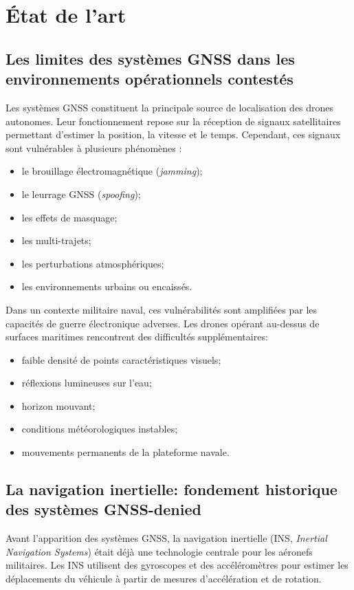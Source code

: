 \documentclass[12pt, a4paper, twoside, openright]{report}
\begin{document}
\section{État de l’art}

\subsection{Les limites des systèmes GNSS dans les environnements opérationnels contestés}
Les systèmes GNSS constituent la principale source de localisation des drones autonomes. Leur fonctionnement repose sur la réception de signaux satellitaires permettant d’estimer la position, la vitesse et le temps. Cependant, ces signaux sont vulnérables à plusieurs phénomènes \cite{mostafa2016gnss, mostafa2022gnss}:
\begin{itemize}
    \item le brouillage électromagnétique (\textit{jamming});
        \item le leurrage GNSS (\textit{spoofing});
    \item les effets de masquage;
    \item les multi-trajets;
    \item les perturbations atmosphériques;
    \item les environnements urbains ou encaissés.
\end{itemize}

Dans un contexte militaire naval, ces vulnérabilités sont amplifiées par les capacités de guerre électronique adverses. Les drones opérant au-dessus de surfaces maritimes rencontrent des difficultés supplémentaires:
\begin{itemize}
    \item faible densité de points caractéristiques visuels;
    \item réflexions lumineuses sur l’eau;
    \item horizon mouvant;
    \item conditions météorologiques instables;
    \item mouvements permanents de la plateforme navale.
\end{itemize}

\subsection{La navigation inertielle: fondement historique des systèmes GNSS-denied}
Avant l’apparition des systèmes GNSS, la navigation inertielle (INS, \textit{Inertial Navigation Systems}) était déjà une technologie centrale pour les aéronefs militaires. Les INS utilisent des gyroscopes et des accéléromètres pour estimer les déplacements du véhicule à partir de mesures d’accélération et de rotation.
\end{document}
